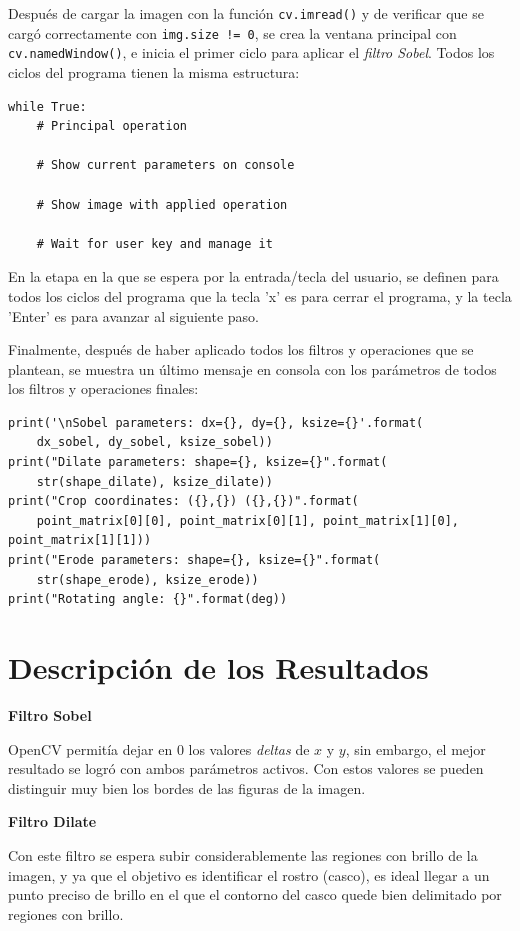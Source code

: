 \documentclass[12pt, a4paper]{article}
\begin{document}
Después de cargar la imagen con la función \lstinline{cv.imread()} y de verificar que se cargó correctamente con \lstinline{img.size != 0}, se crea la ventana principal con \lstinline{cv.namedWindow()}, e inicia el primer ciclo para aplicar el \emph{filtro Sobel}. Todos los ciclos del programa tienen la misma estructura:

\begin{lstlisting}
while True:
    # Principal operation

    # Show current parameters on console

    # Show image with applied operation

    # Wait for user key and manage it
\end{lstlisting}

En la etapa en la que se espera por la entrada/tecla del usuario, se definen para todos los ciclos del programa que la tecla 'x' es para cerrar el programa, y la tecla 'Enter' es para avanzar al siguiente paso.

Finalmente, después de haber aplicado todos los filtros y operaciones que se plantean, se muestra un último mensaje en consola con los parámetros de todos los filtros y operaciones finales:

\begin{lstlisting}
print('\nSobel parameters: dx={}, dy={}, ksize={}'.format(
    dx_sobel, dy_sobel, ksize_sobel))
print("Dilate parameters: shape={}, ksize={}".format(
    str(shape_dilate), ksize_dilate))
print("Crop coordinates: ({},{}) ({},{})".format(
    point_matrix[0][0], point_matrix[0][1], point_matrix[1][0], point_matrix[1][1]))
print("Erode parameters: shape={}, ksize={}".format(
    str(shape_erode), ksize_erode))
print("Rotating angle: {}".format(deg))
\end{lstlisting}

\section{Descripción de los Resultados}
\textbf{Filtro Sobel}

OpenCV permitía dejar en $0$ los valores \emph{deltas} de $x$ y $y$, sin embargo, el mejor resultado se logró con ambos parámetros activos. Con estos valores se pueden distinguir muy bien los bordes de las figuras de la imagen.

\textbf{Filtro Dilate}

Con este filtro se espera subir considerablemente las regiones con brillo de la imagen, y ya que el objetivo es identificar el rostro (casco), es ideal llegar a un punto preciso de brillo en el que el contorno del casco quede bien delimitado por regiones con brillo.
\end{document}
